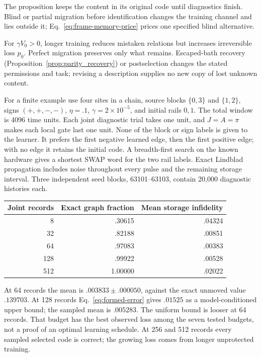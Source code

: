 \documentclass[11pt]{article}
\theoremstyle{definition}
\theoremstyle{remark}
\begin{document}
The proposition keeps the content in its original code until diagnostics
finish. Blind or partial migration before identification changes the
training channel and lies outside it; Eq.~\eqref{eq:frame-memory-price}
prices one specified blind alternative.

For $\gamma V_0>0$, longer training reduces mistaken relations but increases irreversible loss $p_0$. Perfect migration preserves only what remains. Escaped-bath recovery (Proposition~\ref{prop:parity_recovery}) or postselection changes the stated permissions and task; revising a description supplies no new copy of lost unknown content.

For a finite example use four sites in a chain, source blocks $\{0,3\}$ and
$\{1,2\}$, signs $(+,+,-,-)$, $\eta=.1$, $\gamma=2\times10^{-5}$,
and initial rails $0,1$. The total window is 4096 time units. Each joint
diagnostic trial takes one unit, and $J=A=\pi$ makes each local gate last
one unit. None of the block or sign labels is given to the learner. It
prefers the first negative learned edge, then the first positive edge;
with no edge it retains the initial code. A breadth-first search on the
known hardware gives a shortest SWAP word for the two rail labels. Exact
Lindblad propagation includes noise throughout every pulse and the remaining
storage interval. Three independent seed blocks, 63101--63103, contain
20,000 diagnostic histories each.

\begin{center}
\begin{tabular}{@{}rrr@{}}
\toprule
Joint records & Exact graph fraction & Mean storage infidelity\\
\midrule
8   & .30615 & .04324\\
32  & .82188 & .00851\\
64  & .97083 & .00383\\
128 & .99922 & .00528\\
512 & 1.00000 & .02022\\
\bottomrule
\end{tabular}
\end{center}
At 64 records the mean is $.003833\pm.000050$, against the exact unmoved
value $.139703$. At 128 records Eq.~\eqref{eq:formed-error} gives $.01525$
as a model-conditioned upper bound; the sampled mean is $.005283$.
The uniform bound is looser at 64 records. That budget has the best observed
loss among the seven tested budgets, not a proof of an optimal learning
schedule. At 256 and 512 records every sampled selected code is correct;
the growing loss comes from longer unprotected training.
\end{document}
